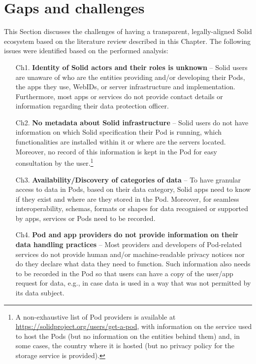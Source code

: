 \section{Gaps and challenges}
\label{sec:challenges}

This Section discusses the challenges of having a transparent, legally-aligned Solid ecosystem based on the literature review described in this Chapter. The following issues were identified based on the performed analysis:

\begin{enumerate} %
    \item [Ch1.] \textbf{Identity of Solid actors and their roles is unknown} -- Solid users are unaware of who are the entities providing and/or developing their Pods, the apps they use, WebIDs, or server infrastructure and implementation. Furthermore, most apps or services do not provide contact details or information regarding their data protection officer.
    \item [Ch2.] \textbf{No metadata about Solid infrastructure} -- Solid users do not have information on which Solid specification their Pod is running, which functionalities are installed within it or where are the servers located. Moreover, no record of this information is kept in the Pod for easy consultation by the user.\footnote{A non-exhaustive list of Pod providers is available at \url{https://solidproject.org/users/get-a-pod}, with information on the service used to host the Pods (but no information on the entities behind them) and, in some cases, the country where it is hosted (but no privacy policy for the storage service is provided).}
    \item [Ch3.] \textbf{Availability/Discovery of categories of data} -- To have granular access to data in Pods, based on their data category, Solid apps need to know if they exist and where are they stored in the Pod. Moreover, for seamless interoperability, schemas, formats or shapes for data recognised or supported by apps, services or Pods need to be recorded.
    \item [Ch4.] \textbf{Pod and app providers do not provide information on their data handling practices} -- Most providers and developers of Pod-related services do not provide human and/or machine-readable privacy notices nor do they declare what data they need to function. Such information also needs to be recorded in the Pod so that users can have a copy of the user/app request for data, e.g., in case data is used in a way that was not permitted by its data subject.

\end{enumerate}
